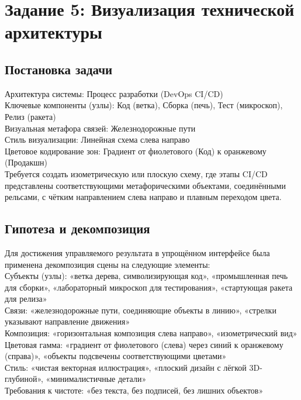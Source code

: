 \section*{Задание 5: Визуализация технической архитектуры}
\subsection{Постановка задачи}
\noindent
Архитектура системы: Процесс разработки (DevOps CI/CD) \\
Ключевые компоненты (узлы): Код (ветка), Сборка (печь), Тест (микроскоп), Релиз (ракета) \\
Визуальная метафора связей: Железнодорожные пути \\
Стиль визуализации: Линейная схема слева направо \\
Цветовое кодирование зон: Градиент от фиолетового (Код) к оранжевому (Продакшн) \\
\newline
Требуется создать изометрическую или плоскую схему, где этапы CI/CD представлены соответствующими метафорическими объектами, соединёнными рельсами, с чётким направлением слева направо и плавным переходом цвета.
\newpage
\subsection{Гипотеза и декомпозиция}
\indent
Для достижения управляемого результата в упрощённом интерфейсе была применена декомпозиция сцены на следующие элементы: \\
Субъекты (узлы): «ветка дерева, символизирующая код», «промышленная печь для сборки», «лабораторный микроскоп для тестирования», «стартующая ракета для релиза» \\
Связи: «железнодорожные пути, соединяющие объекты в линию», «стрелки указывают направление движения» \\
Композиция: «горизонтальная композиция слева направо», «изометрический вид» \\
Цветовая гамма: «градиент от фиолетового (слева) через синий к оранжевому (справа)», «объекты подсвечены соответствующими цветами» \\
Стиль: «чистая векторная иллюстрация», «плоский дизайн с лёгкой 3D-глубиной», «минималистичные детали» \\
Требования к чистоте: «без текста, без подписей, без лишних объектов»
